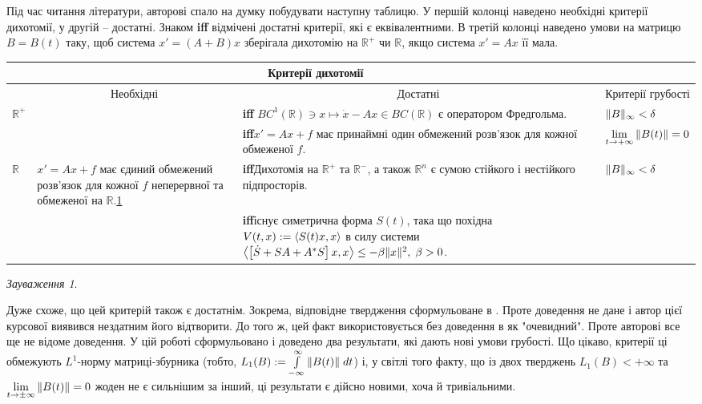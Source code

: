 \documentclass[14pt]{extarticle} %
\theoremstyle{remark}
\newtheorem{remark}{Зауваження}
\begin{document}
Під час читання літератури, авторові спало на думку побудувати наступну таблицю. У першій колонці наведено необхідні критерії
дихотомії, у другій -- достатні. Знаком \textbf{iff} відмічені достатні критерії, які є еквівалентними. В третій колонці
наведено умови на матрицю $B=B(t)$ таку, щоб система $x'=(A+B)x$ зберігала дихотомію на $\mathbb{R}^+$ чи $\mathbb{R}$, якщо
система $x'=Ax$ її мала.
\begin{center}
\newcommand{\mygraycenteredcell}[1]{\multicolumn{1}{c|}{\cellcolor{gray}#1}}
\newcommand{\mygraycenteredcello}{\cellcolor{gray}}

\begin{tabular}{ |l| p{} | p{} | p{}| }
	\mygraycenteredcello&\multicolumn{2}{c|}{\cellcolor{gray}Критерії дихотомії}&\mygraycenteredcello\\\hline
&\mygraycenteredcell{Необхідні}&\mygraycenteredcell{Достатні}&\mygraycenteredcell{Критерії грубості}\\\hline\hline

$\mathbb{R}^+$&
&
\textbf{iff} $BC^1(\mathbb{R})\ni x\mapsto \dot{x}-Ax\in BC(\mathbb{R})$ є оператором Фредгольма. \cite{palmer88}&
$\|B\|_\infty<\delta$ \cite{coppel}\\\hline

&
&
\textbf{iff}$x'=Ax+f$ має принаймні один обмежений розв’язок для кожної обмеженої  $f$. \cite[\S IV, Насл. 3.1]{krein}&
$\lim_{t\to+\infty}\mynorm{B(t)}=0$\cite{coppel}\\\hline\hline
$\mathbb{R}$&
$x'=Ax+f$ має єдиний обмежений розв’язок для кожної $f$ неперервної та обмеженої на $\mathbb{R}$.\ref{MysticThmRemark}&
\textbf{iff}\qquad Дихотомія на $\mathbb{R}^+$ та $\mathbb{R}^-$, а також $\mathbb{R}^n$ є сумою стійкого і нестійкого підпросторів.
	\cite[Proposition 2.1]{palmer84} &
$\|B\|_\infty<\delta$\cite{coppel}\\\hline
&
&
\textbf{iff}існує симетрична форма $S(t)$, така що похідна $V(t,x):=\left<S(t)x,x\right>$ в силу системи
$\left<\left[\dot{S}+SA+A^*S\right]x,x\right>\leq-\beta\|x\|^2,\;\beta>0$. \cite[Теор. 1.1, 1.2]{mitrop}&
\\\hline
\end{tabular}
\end{center}
\begin{remark}\label{MysticThmRemark}\end{remark} Дуже схоже, що цей критерій також є достатнім. Зокрема, відповідне твердження сформульоване
	в \cite[\S IV, Насл. 3.2]{krein}. Проте доведення не дане і автор цієї курсової виявився нездатним його відтворити. 
	До того ж, цей факт використовується без доведення в \cite[ст. 37]{mitrop} як "очевидний". Проте авторові все ще не відоме доведення.
У цій роботі сформульовано і доведено два результати, які дають нові умови грубості. Що цікаво, критерії ці обмежують $L^1$-норму матриці-збурника
(тобто, $L_1(B):=\int_{-\infty}^{\infty}\mynorm{B(t)}\;dt$) і, у світлі того факту, що із двох тверджень $L_1(B)<+\infty$ та $\lim\limits_{t\to
\pm\infty}\mynorm{B(t)}=0$ жоден не є сильнішим за інший, ці результати є дійсно новими, хоча й тривіальними.
\end{document}
